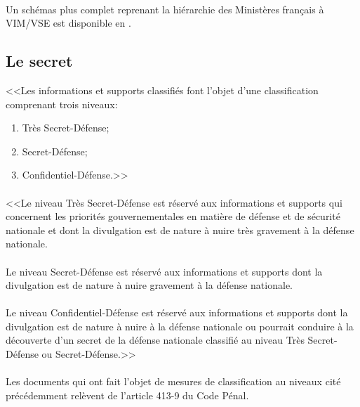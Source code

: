 \documentclass[11pt, book, english, french, standardlists]{upmethodology-document}
\begin{document}
				\paragraph*{}
					Un schémas plus complet reprenant la hiérarchie des Ministères français à VIM/VSE est disponible en .
			\subsection{Le secret}
					<<Les informations et supports classifiés font l'objet d'une classification comprenant trois niveaux:
					\begin{enumerate}
						\item Très Secret-Défense;
						\item Secret-Défense;
						\item Confidentiel-Défense.>>\cite{CodeDefenseR2311-2}
					\end{enumerate}
				\paragraph*{}
					<<Le niveau Très Secret-Défense est réservé aux informations et supports qui concernent les priorités gouvernementales en matière de défense et de sécurité nationale et dont la divulgation est de nature à nuire très gravement à la défense nationale.
				\paragraph*{}
					Le niveau Secret-Défense est réservé aux informations et supports dont la divulgation est de nature à nuire gravement à la défense nationale.
				\paragraph*{}
					Le niveau Confidentiel-Défense est réservé aux informations et supports dont la divulgation est de nature à nuire à la défense nationale ou pourrait conduire à la découverte d'un secret de la défense nationale classifié au niveau Très Secret-Défense ou Secret-Défense.>>\cite{CodeDefenseR2311-3}
				\paragraph*{}
					Les documents qui ont fait l'objet de mesures de classification au niveaux cité précédemment relèvent de l'article 413-9 du Code Pénal\cite{CodePenal413-9}.
\end{document}

